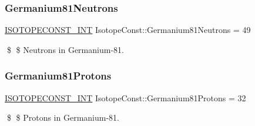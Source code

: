 \subsubsection{\texorpdfstring{Germanium81\+Neutrons}{Germanium81Neutrons}}
{\footnotesize\ttfamily \mbox{\hyperlink{group___isotope_const-_macros_ga5f18360b3e99483a35c32d789e62621c}{I\+S\+O\+T\+O\+P\+E\+C\+O\+N\+S\+T\+\_\+\+I\+NT}} Isotope\+Const\+::\+Germanium81\+Neutrons = 49}

\$ \$ Neutrons in Germanium-\/81. \mbox{\label{group___isotope_const-_germanium-_ge81_ga8785a8a0f9d925ea90a961aed9555fea}} 
\subsubsection{\texorpdfstring{Germanium81\+Protons}{Germanium81Protons}}
{\footnotesize\ttfamily \mbox{\hyperlink{group___isotope_const-_macros_ga5f18360b3e99483a35c32d789e62621c}{I\+S\+O\+T\+O\+P\+E\+C\+O\+N\+S\+T\+\_\+\+I\+NT}} Isotope\+Const\+::\+Germanium81\+Protons = 32}

\$ \$ Protons in Germanium-\/81. 